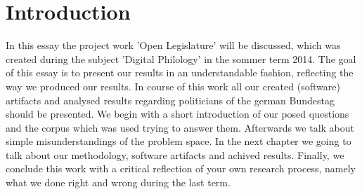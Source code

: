 \documentclass[12pt,paper=a4,nenglish]{scrreprt}
\begin{document}

\renewcommand*\contentsname{Table of contents}
\tableofcontents
\onehalfspacing

\setcounter{page}{1} 
\chapter{Introduction}
In this essay the project work 'Open Legislature' will be discussed, which was
created during the subject 'Digital Philology' in the sommer term 2014.
The goal of this essay is to present our results in an understandable fashion,
reflecting the way we produced our results. 
In course of this work all our created (software) artifacts and analysed results
regarding politicians of the german Bundestag should be presented.
We begin with a short introduction of our posed questions and the corpus which
was used trying to answer them. Afterwards we talk about simple
misunderstandings of the problem space. In the next chapter we going to talk
about our methodology, software artifacts and achived results.
Finally, we conclude this work with a critical reflection of your own research
process, namely what we done right and wrong during the last term.
\end{document}
